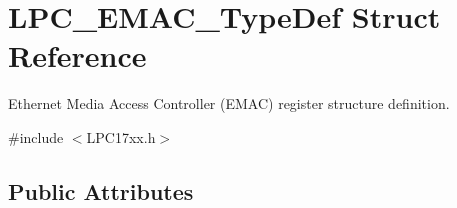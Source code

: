 \hypertarget{struct_l_p_c___e_m_a_c___type_def}{\section{\-L\-P\-C\-\_\-\-E\-M\-A\-C\-\_\-\-Type\-Def \-Struct \-Reference}
\label{struct_l_p_c___e_m_a_c___type_def}
}


\-Ethernet \-Media \-Access \-Controller (\-E\-M\-A\-C) register structure definition.  




{\ttfamily \#include $<$\-L\-P\-C17xx.\-h$>$}

\subsection*{\-Public \-Attributes}
